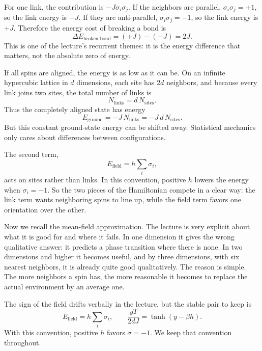 For one link, the contribution is \(-J\sigma_i\sigma_j\). If the neighbors are parallel, \(\sigma_i\sigma_j=+1\), so the link energy is \(-J\). If they are anti-parallel, \(\sigma_i\sigma_j=-1\), so the link energy is \(+J\). Therefore the energy cost of breaking a bond is
\begin{equation}
\Delta E_{\text{broken bond}}=(+J)-(-J)=2J.
\end{equation}
This is one of the lecture's recurrent themes: it is the energy difference that matters, not the absolute zero of energy.

If all spins are aligned, the energy is as low as it can be. On an infinite hypercubic lattice in \(d\) dimensions, each site has \(2d\) neighbors, and because every link joins two sites, the total number of links is
\begin{equation}
N_{\text{links}}=d\,N_{\text{sites}}.
\end{equation}
Thus the completely aligned state has energy
\begin{equation}
E_{\text{ground}}=-J\,N_{\text{links}}=-J\,d\,N_{\text{sites}}.
\end{equation}
But this constant ground-state energy can be shifted away. Statistical mechanics only cares about differences between configurations.

The second term,
\begin{equation}
E_{\text{field}}=h\sum_i \sigma_i,
\end{equation}
acts on sites rather than links. In this convention, positive \(h\) lowers the energy when \(\sigma_i=-1\). So the two pieces of the Hamiltonian compete in a clear way: the link term wants neighboring spins to line up, while the field term favors one orientation over the other.

Now we recall the mean-field approximation. The lecture is very explicit about what it is good for and where it fails. In one dimension it gives the wrong qualitative answer: it predicts a phase transition where there is none. In two dimensions and higher it becomes useful, and by three dimensions, with six nearest neighbors, it is already quite good qualitatively. The reason is simple. The more neighbors a spin has, the more reasonable it becomes to replace the actual environment by an average one.

\begin{remark}
The sign of the field drifts verbally in the lecture, but the stable pair to keep is
\[
E_{\text{field}}=h\sum_i \sigma_i,
\qquad
\frac{yT}{2dJ}=\tanh(y-\beta h).
\]
With this convention, positive \(h\) favors \(\sigma=-1\). We keep that convention throughout.
\end{remark}

